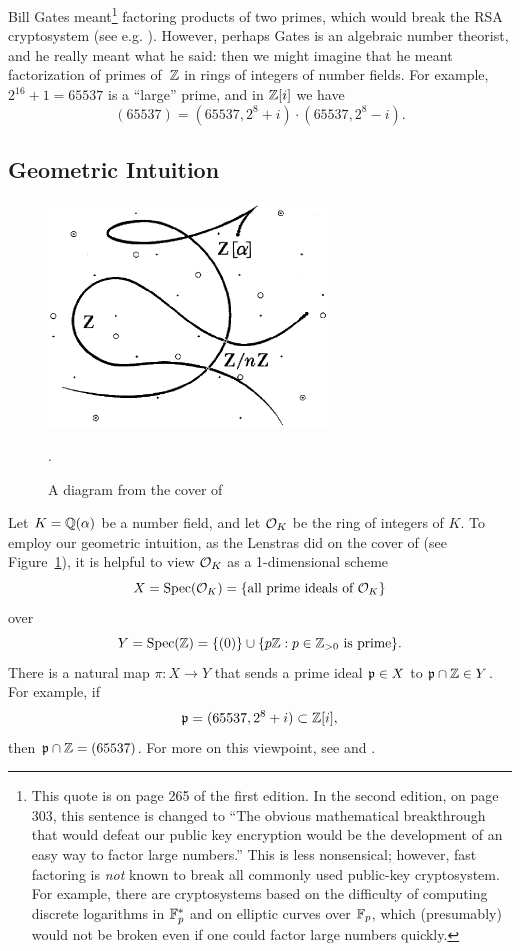 Bill Gates meant\footnote{This quote is on page 265 of the first
  edition.  In the second edition, on page 303, this sentence is
  changed to ``The obvious mathematical breakthrough that would defeat
  our public key encryption would be the development of an easy way to
  factor large numbers.''  This is less nonsensical; however, fast
  factoring is {\em not} known to break all commonly used public-key
  cryptosystem.  For example, there are cryptosystems based on the
  difficulty of computing discrete logarithms in $\mathbb{F}_p^*$ and on
  elliptic curves over $\mathbb{F}_p$, which (presumably) would not be broken
  even if one could factor large numbers quickly.}  factoring products
of two primes, which would break the RSA cryptosystem (see
e.g. \cite[\S3.2]{stein:ent}).  However, perhaps Gates is an
algebraic number theorist, and he really meant what he said: then we
might imagine that he meant factorization of primes of~$\mathbb{Z}$ in rings
of integers of number fields.  For example, $2^{16}+1 = 65537$ is a
``large'' prime, and in $\mathbb{Z}[i]$ we have
$$
  (65537) = (65537, 2^8 + i) \cdot (65537, 2^8 - i).
$$

\subsection{Geometric Intuition}\label{sec:geom_intuition}

\begin{figure}[ht!]
  \centering
  \includegraphics[width=20em]{img/spec}
  \caption{A diagram from the cover of \cite{lenstras:nfs}}.\label{fig:lenstra-cover}
\end{figure}

Let $K=\mathbb{Q}(\alpha)$ be a number field, and let $\mathcal{O}_K$ be the ring of integers
of $K$. To employ our geometric intuition, as the Lenstras did on the cover
of \cite{lenstras:nfs}
(see Figure~\ref{fig:lenstra-cover}),
it is helpful to view $\mathcal{O}_K$ as a 1-dimensional scheme
$$
  X = \operatorname{Spec}(\mathcal{O}_K) = \{\text{all prime ideals of $\mathcal{O}_K$}\}
$$
over
$$
  Y=\operatorname{Spec}(\mathbb{Z}) = \{ (0) \} \cup \{ p\mathbb{Z} : p \in\mathbb{Z}_{>0} \text{ is prime}\}.
$$
There is a natural map $\pi: X \rightarrow Y$ that sends a prime ideal $\mathfrak{p}\in X$ to
$\mathfrak{p} \cap \mathbb{Z}\in Y$. For example, if
$$
  \mathfrak{p} = (65537, 2^8 + i) \subset \mathbb{Z}[i],
$$
then $\mathfrak{p} \cap \mathbb{Z} = (65537)$. For more on this viewpoint,
see \cite{hartshorne} and \cite[Ch.~2]{eisenbud_harris:geometry}.

